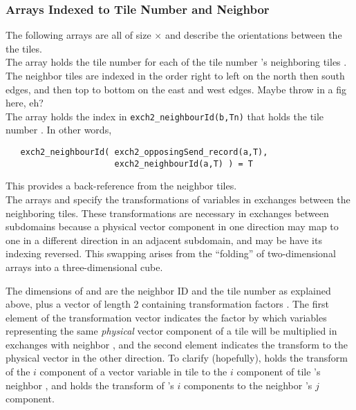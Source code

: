 \subsubsection{Arrays Indexed to Tile Number and Neighbor}

The following arrays are all of size
$\times$ and describe the
orientations between the the tiles. \\

The array  holds the tile number
 for each of the tile number 's neighboring tiles
.  The neighbor tiles are indexed 
in the order right to left on the north then south edges, and then top
to bottom on the east and west edges.  Maybe throw in a fig here, eh?
\\

\sloppy
The  array holds the index
 in \texttt{exch2\_neighbourId(b,Tn)} that holds the tile
number .  In other words,
\begin{verbatim}
   exch2_neighbourId( exch2_opposingSend_record(a,T),
                      exch2_neighbourId(a,T) ) = T
\end{verbatim}
This provides a back-reference from the neighbor tiles. \\

The arrays  and
 specify the transformations of variables
in exchanges between the neighboring tiles.  These transformations are
necessary in exchanges between subdomains because a physical vector
component in one direction may map to one in a different direction in
an adjacent subdomain, and may be have its indexing reversed. This
swapping arises from the ``folding'' of two-dimensional arrays into a
three-dimensional cube.

The dimensions of  and 
are the neighbor ID  and the tile number  as explained
above, plus a vector of length 2 containing transformation factors
.  The first element of the transformation vector indicates
the factor  by which variables representing the same
\emph{physical} vector component of a tile  will be multiplied
in exchanges with neighbor , and the second element indicates
the transform to the physical vector in the other direction.  To
clarify (hopefully),  holds the transform of
the $i$ component of a vector variable in tile  to the $i$
component of tile 's neighbor , and
 holds the transform of 's $i$
components to the neighbor 's $j$ component. \\
 
